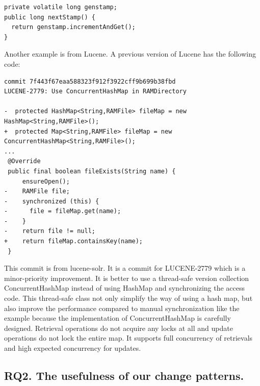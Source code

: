 
\begin{lstlisting}
private volatile long genstamp;
public long nextStamp() {
  return genstamp.incrementAndGet();
}
\end{lstlisting}

Another example is from Lucene. A previous version of Lucene has the following code:

\begin{lstlisting}
commit 7f443f67eaa588323f912f3922cff9b699b38fbd
LUCENE-2779: Use ConcurrentHashMap in RAMDirectory

-  protected HashMap<String,RAMFile> fileMap = new HashMap<String,RAMFile>();
+  protected Map<String,RAMFile> fileMap = new ConcurrentHashMap<String,RAMFile>();
...
 @Override
 public final boolean fileExists(String name) {
     ensureOpen();
-    RAMFile file;
-    synchronized (this) {
-      file = fileMap.get(name);
-    }
-    return file != null;
+    return fileMap.containsKey(name);
 }
\end{lstlisting}

This commit is from lucene-solr. It is a commit for LUCENE-2779 which is a minor-priority improvement. It is better to use a thread-safe version collection ConcurrentHashMap instead of using HashMap and synchronizing the access code. This thread-safe class not only simplify the way of using a hash map, but also improve the performance compared to manual synchronization like the example because the implementation of ConcurrentHashMap is carefully designed. Retrieval operations do not acquire any locks at all and update operations do not lock the entire map. It supports full concurrency of retrievals and high expected concurrency for updates.

%
%
%
%
%
%

\subsection{RQ2. The usefulness of our change patterns.}
\label{sec:result:sample}

